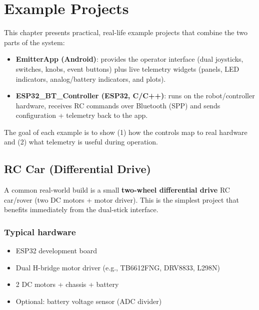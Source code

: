 \chapter{Example Projects}
\label{ch:example-projects}

This chapter presents practical, real-life example projects that combine the two parts of the system:

\begin{itemize}
    \item \textbf{EmitterApp (Android)}: provides the operator interface (dual joysticks, switches, knobs, event buttons) plus live telemetry widgets (panels, LED indicators, analog/battery indicators, and plots).
    \item \textbf{ESP32\_BT\_Controller (ESP32, C/C++)}: runs on the robot/controller hardware, receives RC commands over Bluetooth (SPP) and sends configuration + telemetry back to the app.
\end{itemize}

The goal of each example is to show (1) how the controls map to real hardware and (2) what telemetry is useful during operation.

\section{RC Car (Differential Drive)}
\label{sec:example-rc-car}

A common real-world build is a small \textbf{two-wheel differential drive} RC car/rover (two DC motors + motor driver). This is the simplest project that benefits immediately from the dual-stick interface.

\subsection*{Typical hardware}
\begin{itemize}
    \item ESP32 development board
    \item Dual H-bridge motor driver (e.g., TB6612FNG, DRV8833, L298N)
    \item 2 DC motors + chassis + battery
    \item Optional: battery voltage sensor (ADC divider)
\end{itemize}

